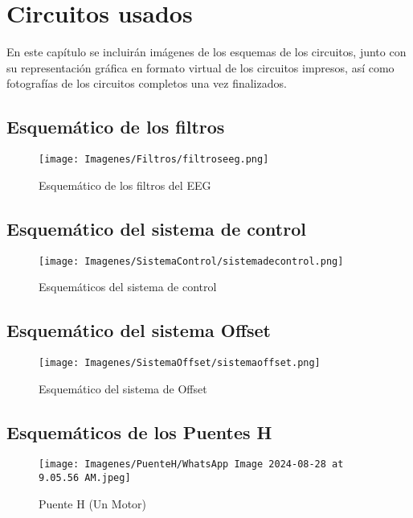 \documentclass{article}
\begin{document}
\section{Circuitos usados}
En este capítulo se incluirán imágenes de los esquemas de los circuitos, junto con su representación gráfica en formato virtual de los circuitos impresos, así como fotografías de los circuitos completos una vez finalizados.


\subsection{Esquemático de los filtros}
\begin{figure}[H]
    \centering
    \texttt{[image: Imagenes/Filtros/filtroseeg.png]}
    \caption{Esquemático de los filtros del EEG}
\end{figure}

\subsection{Esquemático del sistema de control}
\begin{figure}[H]
    \centering
    \texttt{[image: Imagenes/SistemaControl/sistemadecontrol.png]}
    \caption{Esquemáticos del sistema de control}
\end{figure}

\subsection{Esquemático del sistema Offset}
\begin{figure}[H]
    \centering
    \texttt{[image: Imagenes/SistemaOffset/sistemaoffset.png]}
    \caption{Esquemático del sistema de Offset}
\end{figure}

\subsection{Esquemáticos de los Puentes H}
\begin{figure}[H]
    \centering
     \texttt{[image: Imagenes/PuenteH/WhatsApp Image 2024-08-28 at 9.05.56 AM.jpeg]}
    \caption{Puente H (Un Motor)}
\end{figure}
\end{document}
